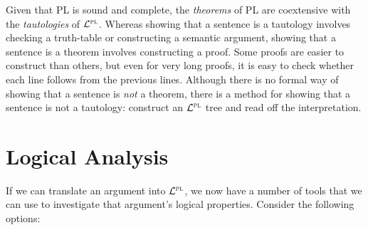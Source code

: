 Given that PL is sound and complete, the \emph{theorems} of PL are coextensive with the \emph{tautologies} of $\mathcal{L}^{\textsc{pl}}$.
Whereas showing that a sentence is a tautology involves checking a truth-table or constructing a semantic argument, showing that a sentence is a theorem involves constructing a proof.
Some proofs are easier to construct than others, but even for very long proofs, it is easy to check whether each line follows from the previous lines.
Although there is no formal way of showing that a sentence is \emph{not} a theorem, there is a method for showing that a sentence is not a tautology: construct an $\mathcal{L}^{\textsc{pl}}$ tree and read off the interpretation.


\section{Logical Analysis}

If we can translate an argument into $\mathcal{L}^{\textsc{pl}}$, we now have a number of tools that we can use to investigate that argument's logical properties.
Consider the following options:

